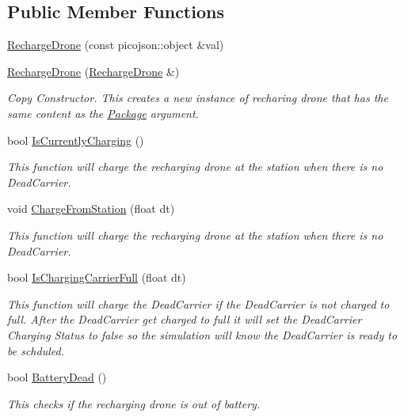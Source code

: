\subsection*{Public Member Functions}
\begin{DoxyCompactItemize}
\item 
\hyperlink{classcsci3081_1_1RechargeDrone_a04313869575a751f7f763cf72c2e6410}{Recharge\+Drone} (const picojson\+::object \&val)
\item 
\hyperlink{classcsci3081_1_1RechargeDrone_aa7f639598af768a3c92c082f5d4e74fd}{Recharge\+Drone} (\hyperlink{classcsci3081_1_1RechargeDrone}{Recharge\+Drone} \&)
\begin{DoxyCompactList}\small\item\em Copy Constructor. This creates a new instance of recharing drone that has the same content as the \hyperlink{classcsci3081_1_1Package}{Package} argument. \end{DoxyCompactList}\item 
bool \hyperlink{classcsci3081_1_1RechargeDrone_a21f38d9534ed51a82006df0a4d7ab78e}{Is\+Currently\+Charging} ()
\begin{DoxyCompactList}\small\item\em This function will charge the recharging drone at the station when there is no Dead\+Carrier. \end{DoxyCompactList}\item 
void \hyperlink{classcsci3081_1_1RechargeDrone_aae4cc9921818edce62664130e29cc205}{Charge\+From\+Station} (float dt)
\begin{DoxyCompactList}\small\item\em This function will charge the recharging drone at the station when there is no Dead\+Carrier. \end{DoxyCompactList}\item 
bool \hyperlink{classcsci3081_1_1RechargeDrone_af6c18a005a235b569b10225f9f0b3d78}{Is\+Charging\+Carrier\+Full} (float dt)
\begin{DoxyCompactList}\small\item\em This function will charge the Dead\+Carrier if the Dead\+Carrier is not charged to full. After the Dead\+Carrier get charged to full it will set the Dead\+Carrier Charging Status to false so the simulation will know the Dead\+Carrier is ready to be schduled. \end{DoxyCompactList}\item 
bool \hyperlink{classcsci3081_1_1RechargeDrone_a17d45a9ee48936ddbe019e8ab677f7cf}{Battery\+Dead} ()
\begin{DoxyCompactList}\small\item\em This checks if the recharging drone is out of battery. \end{DoxyCompactList}\item 

\end{DoxyCompactItemize}
